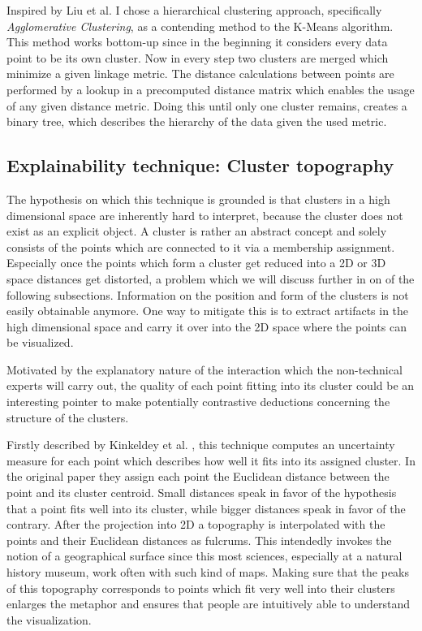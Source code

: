 Inspired by Liu et al. \cite{Liu:2018:INE:3219819.3220001} I chose a hierarchical clustering approach, specifically \textit{Agglomerative Clustering}, as a contending method to the K-Means algorithm. This method works bottom-up since in the beginning it considers every data point to be its own cluster. Now in every step two clusters are merged which minimize a given linkage metric. The distance calculations between points are performed by a lookup in a precomputed distance matrix which enables the usage of any given distance metric. Doing this until only one cluster remains, creates a binary tree, which describes the hierarchy of the data given the used metric. 



\subsection{Explainability technique: Cluster topography }

The hypothesis on which this technique is grounded is that clusters in a high dimensional space are inherently hard to interpret, because the cluster does not exist as an explicit object. A cluster is rather an abstract concept and solely consists of the points which are connected to it via a membership assignment. Especially once the points which form a cluster get reduced into a 2D or 3D space distances get distorted, a problem which we will discuss further in on of the following subsections. Information on the position and form of the clusters is not easily obtainable anymore. One way to mitigate this is to extract artifacts in the high dimensional space and carry it over into the 2D space where the points can be visualized.

Motivated by the explanatory nature of the interaction which the non-technical experts will carry out, the quality of each point fitting into its cluster could be an interesting pointer to make potentially contrastive deductions concerning the structure of the clusters.

Firstly described by Kinkeldey et al. \cite{christophkinkeldeySupportingInterpretabilityClustering2019}, this technique computes an uncertainty measure for each point which describes how well it fits into its assigned cluster. In the original paper they assign each point the Euclidean distance between the point and its cluster centroid. Small distances speak in favor of the hypothesis that a point fits well into its cluster, while bigger distances speak in favor of the contrary. After the projection into 2D a topography is interpolated with the points and their Euclidean distances as fulcrums. This intendedly invokes the notion of a geographical surface since this most sciences, especially at a natural history museum, work often with such kind of maps. Making sure that the peaks of this topography corresponds to points which fit very well into their clusters enlarges the metaphor and ensures that people are intuitively able to understand the visualization. 

